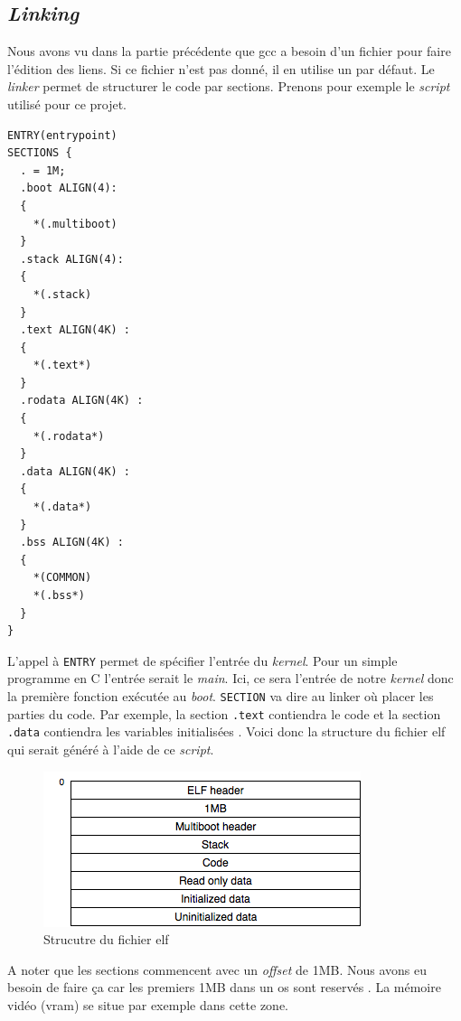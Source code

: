 \documentclass[a4paper]{article}
\begin{document}

\subsection{\textit{Linking}}
Nous avons vu dans la partie précédente que \acrshort{gcc} a besoin d'un fichier
pour faire l'édition des liens. Si ce fichier n'est pas donné, il en utilise un par
défaut. Le \textit{linker} permet de structurer le code par sections. Prenons
pour exemple le \textit{script} utilisé pour ce projet.

\begin{verbatim}
ENTRY(entrypoint)
SECTIONS {
  . = 1M;
  .boot ALIGN(4):
  {
    *(.multiboot)
  }
  .stack ALIGN(4):
  {
    *(.stack)
  }
  .text ALIGN(4K) :
  {
    *(.text*)
  }
  .rodata ALIGN(4K) :
  {
    *(.rodata*)
  }
  .data ALIGN(4K) :
  {
    *(.data*)
  }
  .bss ALIGN(4K) :
  {
    *(COMMON)
    *(.bss*)
  }
}
\end{verbatim}

L'appel à \texttt{ENTRY} permet de spécifier l'entrée du \textit{kernel}.
Pour un simple programme en C l'entrée serait le \textit{main}. Ici, ce sera
l'entrée de notre \textit{kernel} donc la première fonction exécutée au \textit{boot}.
\texttt{SECTION} va dire au linker où placer les parties du code. Par exemple, 
la section \texttt{.text} contiendra le code et la section \texttt{.data}
contiendra les variables initialisées \cite{ref9,ref10,ref11}. Voici donc la structure
du fichier \acrshort{elf} qui serait généré à l'aide de ce \textit{script}.

\begin{figure}[!h]
  \centering
  \includegraphics[scale=0.75]{images/elf_struct.png}
  \caption{Strucutre du fichier \acrshort{elf}}
\end{figure}

A noter que les sections commencent avec un \textit{offset} de 1MB. Nous avons eu
besoin de faire ça car les premiers 1MB dans un \acrshort{os} sont reservés \cite{ref13}.
La mémoire vidéo (\acrshort{vram}) se situe par exemple dans cette zone.
\end{document}
